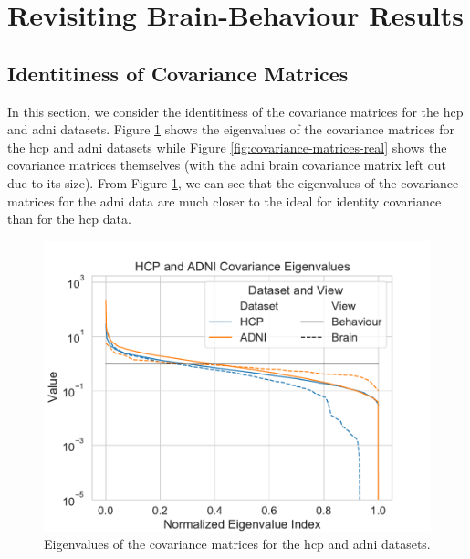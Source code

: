 %
%

\section{Revisiting Brain-Behaviour Results}

\subsection{Identitiness of Covariance Matrices}
In this section, we consider the identitiness of the covariance matrices for the \acrshort{hcp} and \acrshort{adni} datasets.
Figure \ref{fig:covariance-eigenvalues-real} shows the eigenvalues of the covariance matrices for the \acrshort{hcp} and \acrshort{adni} datasets while Figure \ref{fig:covariance-matrices-real} shows the covariance matrices themselves (with the \acrshort{adni} brain covariance matrix left out due to its size).
From Figure \ref{fig:covariance-eigenvalues-real}, we can see that the eigenvalues of the covariance matrices for the \acrshort{adni} data are much closer to the ideal for identity covariance than for the \acrshort{hcp} data.
\begin{figure}
    \centering
    \includegraphics[width=0.8\linewidth]{figures/covariance/hcp_adni_covariance_eigenvalues}
    \caption{Eigenvalues of the covariance matrices for the \acrshort{hcp} and \acrshort{adni} datasets.}\label{fig:covariance-eigenvalues-real}
\end{figure}

